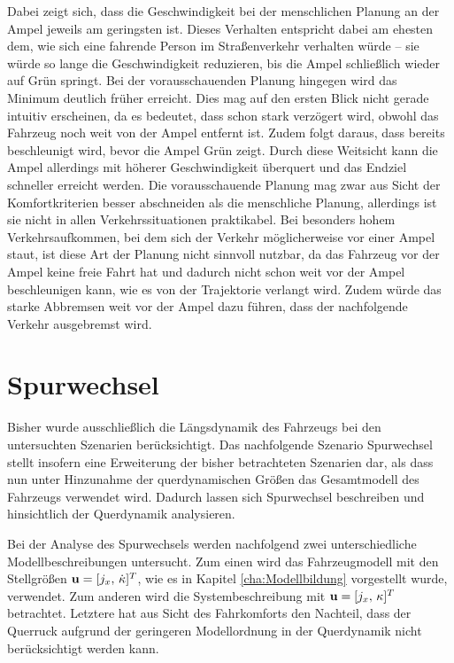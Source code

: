 Dabei zeigt sich, dass die Geschwindigkeit bei der menschlichen Planung an der Ampel jeweils am geringsten ist. Dieses Verhalten entspricht dabei am ehesten dem, wie sich eine fahrende Person im Straßenverkehr verhalten würde -- sie würde so lange die Geschwindigkeit reduzieren, bis die Ampel schließlich wieder auf Grün springt. Bei der vorausschauenden Planung hingegen wird das Minimum deutlich früher erreicht. Dies mag auf den ersten Blick nicht gerade intuitiv erscheinen, da es bedeutet, dass schon stark verzögert wird, obwohl das Fahrzeug noch weit von der Ampel entfernt ist. Zudem folgt daraus, dass bereits beschleunigt wird, bevor die Ampel Grün zeigt. Durch diese Weitsicht kann die Ampel allerdings mit höherer Geschwindigkeit überquert und das Endziel schneller erreicht werden. Die vorausschauende Planung mag zwar aus Sicht der Komfortkriterien besser abschneiden als die menschliche Planung, allerdings ist sie nicht in allen Verkehrssituationen praktikabel. Bei besonders hohem Verkehrsaufkommen, bei dem sich der Verkehr möglicherweise vor einer Ampel staut, ist diese Art der Planung nicht sinnvoll nutzbar, da das Fahrzeug vor der Ampel keine freie Fahrt hat und dadurch nicht schon weit vor der Ampel beschleunigen kann, wie es von der Trajektorie verlangt wird. Zudem würde das starke Abbremsen weit vor der Ampel dazu führen, dass der nachfolgende Verkehr ausgebremst wird. 

\section{Spurwechsel}\label{sec:Spurwechsel}
Bisher wurde ausschließlich die Längsdynamik des Fahrzeugs bei den untersuchten Szenarien berücksichtigt. Das nachfolgende Szenario Spurwechsel stellt insofern eine Erweiterung der bisher betrachteten Szenarien dar, als dass nun unter Hinzunahme der querdynamischen Größen das Gesamtmodell des Fahrzeugs verwendet wird. Dadurch lassen sich Spurwechsel beschreiben und hinsichtlich der Querdynamik analysieren. 

Bei der Analyse des Spurwechsels werden nachfolgend zwei unterschiedliche Modellbeschreibungen untersucht. Zum einen wird das Fahrzeugmodell mit den Stellgrößen $\boldsymbol{\mathrm{u}} = [j_x,\,\dot{\kappa}]^T$, wie es in Kapitel \ref{cha:Modellbildung} vorgestellt wurde, verwendet. Zum anderen wird die Systembeschreibung mit $\boldsymbol{\mathrm{u}} = [j_x,\,\kappa]^T$ betrachtet. Letztere hat aus Sicht des Fahrkomforts den Nachteil, dass der Querruck aufgrund der geringeren Modellordnung in der Querdynamik nicht berücksichtigt werden kann. 

